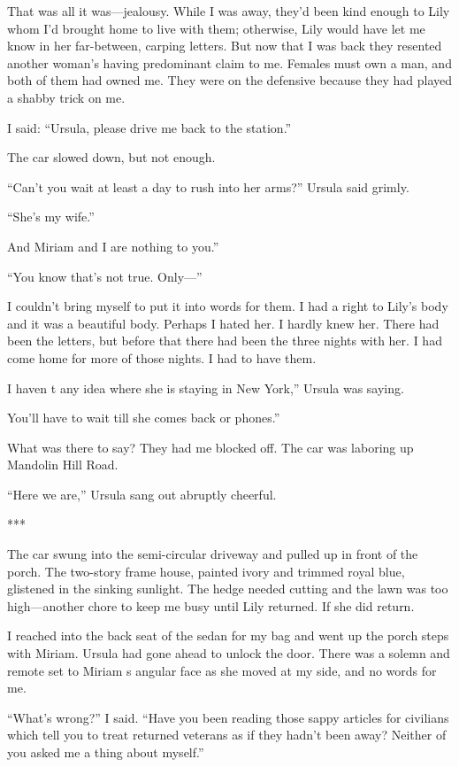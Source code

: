 \documentclass{novel}
\begin{document}
That was all it was—jealousy. While I was away, they’d been kind enough to Lily whom I’d brought home to live with them; otherwise, Lily would have let me know in her far-between, carping letters. But now that I was back they resented another woman’s having predominant claim to me. Females must own a man, and both of them had owned me. They were on the defensive because they had played a shabby trick on me.

I said: “Ursula, please drive me back to the station.”

The car slowed down, but not enough.

“Can’t you wait at least a day to rush into her arms?” Ursula said grimly.

“She’s my wife.”

And Miriam and I are nothing to you.”

“You know that’s not true. Only—”

I couldn’t bring myself to put it into words for them. I had a right to Lily’s body and it was a beautiful body. Perhaps I hated her. I hardly knew her. There had been the letters, but before that there had been the three nights with her. I had come home for more of those nights. I had to have them.

I haven t any idea where she is staying in New York,” Ursula was saying.

You’ll have to wait till she comes back or phones.”

What was there to say? They had me blocked off. The car was laboring up Mandolin Hill Road.

“Here we are,” Ursula sang out abruptly cheerful.

***

The car swung into the semi-circular driveway and pulled up in front of the porch. The two-story frame house, painted ivory and trimmed royal blue, glistened in the sinking sunlight. The hedge needed cutting and the lawn was too high—another chore to keep me busy until Lily returned. If she did return.

I reached into the back seat of the sedan for my bag and went up the porch steps with Miriam. Ursula had gone ahead to unlock the door. There was a solemn and remote set to Miriam s angular face as she moved at my side, and no words for me.

“What’s wrong?” I said. “Have you been reading those sappy articles for civilians which tell you to treat returned veterans as if they hadn’t been away? Neither of you asked me a thing about myself.”
\end{document}
